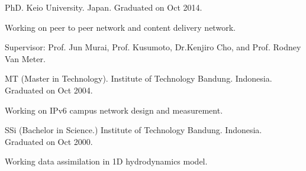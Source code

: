 

\begin{cventries}

  \cventry
    {PhD.} %
    {Keio University.} %
    {Japan.} %
    {Graduated on Oct 2014.} %
    {
      \begin{cvitems} %
        \item {Working on peer to peer network and content delivery network.}
        \item {Supervisor: Prof. Jun Murai, Prof. Kusumoto, Dr.Kenjiro Cho, and Prof. Rodney Van Meter.}
      \end{cvitems}
    }

  \cventry
    {MT (Master in Technology).} %
    {Institute of Technology Bandung.} %
    {Indonesia.}
    {Graduated on Oct 2004.}
    {
      \begin{cvitems}
      \item {Working on IPv6 campus network design and measurement.}
      \end{cvitems}
    }

  \cventry
    {SSi (Bachelor in Science.)} %
    {Institute of Technology Bandung.} %
    {Indonesia.}
    {Graduated on Oct 2000.}
    {
      \begin{cvitems}
      \item {Working data assimilation in 1D hydrodynamics model.}
      \end{cvitems}
    }

\end{cventries}
